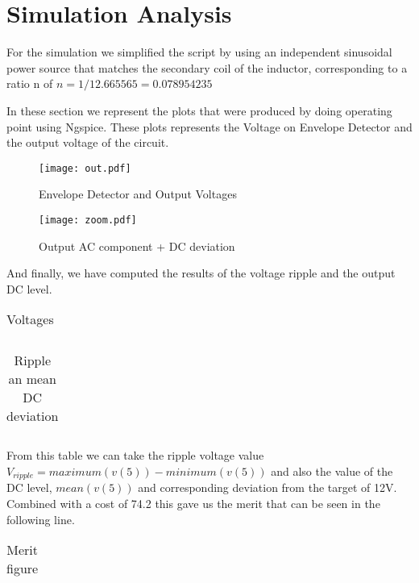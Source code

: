 \section{Simulation Analysis}
\label{sec:simulation} 
For the simulation we simplified the script by using an independent sinusoidal power source that matches the secondary coil of the inductor, corresponding to a ratio n of $n=1/12.665565 = 0.078954235$
\par In these section we represent the plots that were produced by doing operating point using Ngspice. These plots represents the Voltage on Envelope Detector and the output voltage of the circuit.


\begin{figure} [!htb] 
  \texttt{[image: out.pdf]}
  \caption{Envelope Detector and Output Voltages}
  \label{fig:theoplots}
  \endminipage\hfill
\end{figure}



\begin{figure} [!htb]
  \texttt{[image: zoom.pdf]}
  \caption{Output AC component + DC deviation}
  \label{fig:theoplots}
  \endminipage\hfill
\end{figure}


\par And finally, we have computed the results of the voltage ripple and the output DC level.  

\FloatBarrier
\begin{table}[h]
  \centering
  \begin{tabular}{|c|c|c|}
    \hline    
    
    \hline
  \end{tabular}
  \caption{Voltages}
  \label{tab:Spice1}
\end{table}
\FloatBarrier  

\FloatBarrier
\begin{table}[h]
  \centering
  \begin{tabular}{|c|c|c|}
    \hline    
    
    \hline
  \end{tabular}
  \caption{Ripple an mean DC deviation}
  \label{tab:Spice2}
\end{table}
\FloatBarrier 

From this table we can take the ripple voltage value $V_{ripple}=maximum(v(5))-minimum(v(5))$ and also the value of the DC level, $mean(v(5))$ and corresponding deviation from the target of 12V.\\
Combined with a cost of 74.2 this gave us the merit that can be seen in the following line.


\FloatBarrier
\begin{table}[h]
  \centering
  \begin{tabular}{|c|c|c|}
    \hline    
    
    \hline
  \end{tabular}
  \caption{Merit figure}
  \label{tab:Spice2}
\end{table}
\FloatBarrier 
